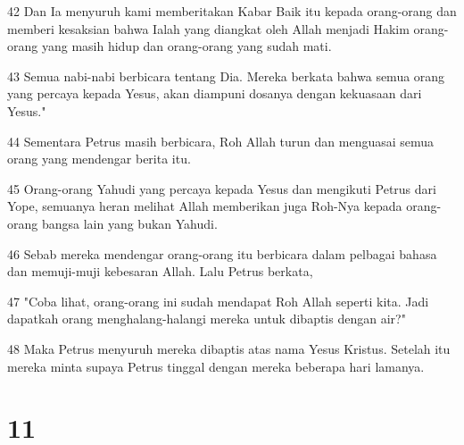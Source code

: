 \par 42 Dan Ia menyuruh kami memberitakan Kabar Baik itu kepada orang-orang dan memberi kesaksian bahwa Ialah yang diangkat oleh Allah menjadi Hakim orang-orang yang masih hidup dan orang-orang yang sudah mati.
\par 43 Semua nabi-nabi berbicara tentang Dia. Mereka berkata bahwa semua orang yang percaya kepada Yesus, akan diampuni dosanya dengan kekuasaan dari Yesus."
\par 44 Sementara Petrus masih berbicara, Roh Allah turun dan menguasai semua orang yang mendengar berita itu.
\par 45 Orang-orang Yahudi yang percaya kepada Yesus dan mengikuti Petrus dari Yope, semuanya heran melihat Allah memberikan juga Roh-Nya kepada orang-orang bangsa lain yang bukan Yahudi.
\par 46 Sebab mereka mendengar orang-orang itu berbicara dalam pelbagai bahasa dan memuji-muji kebesaran Allah. Lalu Petrus berkata,
\par 47 "Coba lihat, orang-orang ini sudah mendapat Roh Allah seperti kita. Jadi dapatkah orang menghalang-halangi mereka untuk dibaptis dengan air?"
\par 48 Maka Petrus menyuruh mereka dibaptis atas nama Yesus Kristus. Setelah itu mereka minta supaya Petrus tinggal dengan mereka beberapa hari lamanya.

\chapter{11}


